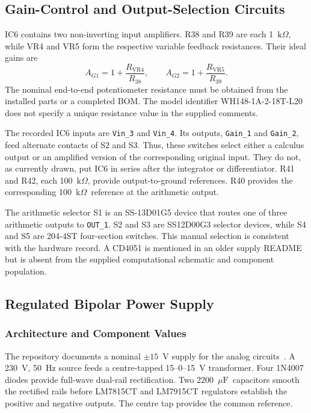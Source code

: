 \documentclass[11pt,a4paper]{article}
\newcommand{\kohm}{\ensuremath{\mathrm{k}\Omega}}
\newcommand{\uF}{\ensuremath{\mu\mathrm{F}}}
\begin{document}
\subsection{Gain-Control and Output-Selection Circuits}
IC6 contains two non-inverting input amplifiers. R38 and R39 are each 1~\kohm, while VR4 and VR5 form the respective variable feedback resistances. Their ideal gains are
\begin{equation}
A_{G1}=1+\frac{R_{\mathrm{VR4}}}{R_{38}},\qquad
A_{G2}=1+\frac{R_{\mathrm{VR5}}}{R_{39}}.
\end{equation}
The nominal end-to-end potentiometer resistance must be obtained from the installed parts or a completed BOM. The model identifier WH148-1A-2-18T-L20 does not specify a unique resistance value in the supplied comments.

The recorded IC6 inputs are \texttt{Vin\_\allowbreak{}3} and \texttt{Vin\_\allowbreak{}4}. Its outputs, \texttt{Gain\_\allowbreak{}1} and \texttt{Gain\_\allowbreak{}2}, feed alternate contacts of S2 and S3. Thus, these switches select either a calculus output or an amplified version of the corresponding original input. They do not, as currently drawn, put IC6 in series after the integrator or differentiator. R41 and R42, each 100~\kohm, provide output-to-ground references. R40 provides the corresponding 100~\kohm\ reference at the arithmetic output.

The arithmetic selector S1 is an SS-13D01G5 device that routes one of three arithmetic outputs to \texttt{OUT\_\allowbreak{}1}. S2 and S3 are SS12D00G3 selector devices, while S4 and S5 are 204-4ST four-section switches. This manual selection is consistent with the hardware record. A CD4051 is mentioned in an older supply README but is absent from the supplied computational schematic and component population.


\subsection{Regulated Bipolar Power Supply}
\subsubsection{Architecture and Component Values}
The repository documents a nominal $\pm15$~V supply for the analog circuits~\cite{repository}. A 230~V, 50~Hz source feeds a centre-tapped 15--0--15~V transformer. Four 1N4007 diodes provide full-wave dual-rail rectification. Two 2200~\uF\ capacitors smooth the rectified rails before LM7815CT and LM7915CT regulators establish the positive and negative outputs. The centre tap provides the common reference.
\end{document}
